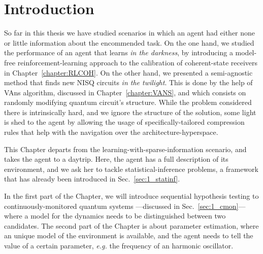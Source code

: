 \section{Introduction}
So far in this thesis we have studied scenarios in which an agent had either none or little information about the encommended task. On the one hand, we studied the performance of an agent that learns \textit{in the darkness}, by introducing a model-free reinforcement-learning approach to the calibration of coherent-state receivers in Chapter~\ref{chapter:RLCOH}. On the other hand, we presented a semi-agnostic method that finds new NISQ circuits \textit{in the twilight}. This is done by the help of VAns algorithm, discussed in Chapter~\ref{chapter:VANS}, and which consists on randomly modifying quantum circuit's structure. While the problem considered there is intrinsically hard, and we ignore the structure of the solution, some light is shed to the agent by allowing the usage of specifically-tailored compression rules that help with the navigation over the architecture-hyperspace.

This Chapter departs from the learning-with-sparse-information scenario, and takes the agent to a daytrip. Here, the agent has a full description of its environment, and we ask her to tackle statistical-inference problems, a framework that has already been introduced in Sec.~\ref{sec:1_statinf}.

In the first part of the Chapter, we will introduce sequential hypothesis testing to continuously-monitored quantum systems ---discussed in Sec.~\ref{sec:1_cmon}--- where a model for the dynamics needs to be distinguished between two candidates. The second part of the Chapter is about parameter estimation, where an unique model of the environment is available, and the agent needs to tell the value of a certain parameter, \textit{e.g.} the frequency of an harmonic oscillator.

